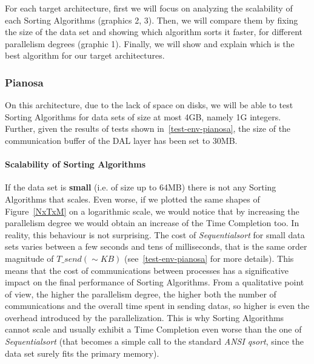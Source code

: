 For each target architecture, first we will focus on analyzing the scalability of each Sorting Algorithms (graphics 2, 3). Then, we will compare them by fixing the size of the data set and showing which algorithm sorts it faster, for different parallelism degrees (graphic 1). Finally, we will show and explain which is the best algorithm for our target architectures. 

\subsubsection{Pianosa}
On this architecture, due to the lack of space on disks, we will be able to test Sorting Algorithms for data sets of size at most 4GB, namely 1G integers. Further, given the results of tests shown in~\ref{test-env-pianosa}, the size of the communication buffer of the DAL layer has been set to 30MB. 

\paragraph{Scalability of Sorting Algorithms}
If the data set is \textbf{small} (i.e. of size up to 64MB) there is not any Sorting Algorithms that scales. Even worse, if we plotted the same shapes of Figure~\ref{NxTxM} on a logarithmic scale, we would notice that by increasing the parallelism degree we would obtain an increase of the Time Completion too. In reality, this behaviour is not surprising. The cost of \textit{Sequentialsort} for small data sets varies between a few seconds and tens of milliseconds, that is the same order magnitude of $T\_send( \sim KB )$ (see~\ref{test-env-pianosa} for more details). This means that the cost of communications between processes has a significative impact on the final performance of Sorting Algorithms. From a qualitative point of view, the higher the parallelism degree, the higher both the number of communications and the overall time spent in sending datas, so higher is even the overhead introduced by the parallelization. This is why Sorting Algorithms cannot scale and usually exhibit a Time Completion even worse than the one of \textit{Sequentialsort} (that becomes a simple call to the standard \textit{ANSI qsort}, since the data set surely fits the primary memory).

